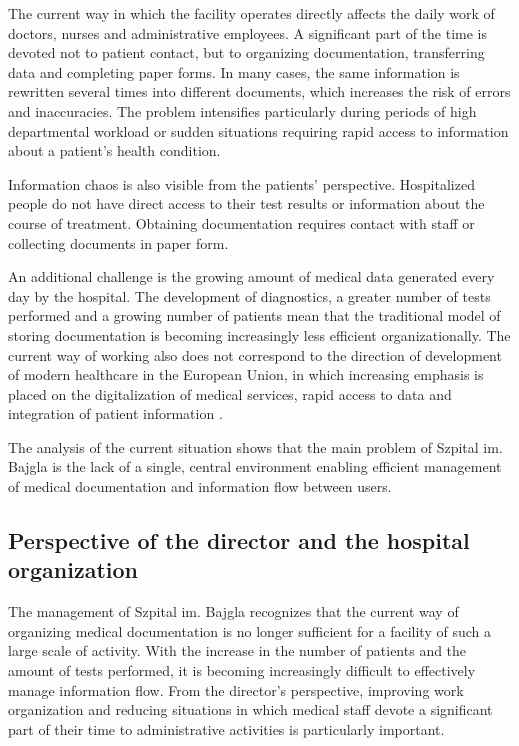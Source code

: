 The current way in which the facility operates directly affects the daily work of doctors, nurses and administrative employees. A significant part of the time is devoted not to patient contact, but to organizing documentation, transferring data and completing paper forms. In many cases, the same information is rewritten several times into different documents, which increases the risk of errors and inaccuracies. The problem intensifies particularly during periods of high departmental workload or sudden situations requiring rapid access to information about a patient's health condition.

Information chaos is also visible from the patients' perspective. Hospitalized people do not have direct access to their test results or information about the course of treatment. Obtaining documentation requires contact with staff or collecting documents in paper form.

An additional challenge is the growing amount of medical data generated every day by the hospital. The development of diagnostics, a greater number of tests performed and a growing number of patients mean that the traditional model of storing documentation is becoming increasingly less efficient organizationally. The current way of working also does not correspond to the direction of development of modern healthcare in the European Union, in which increasing emphasis is placed on the digitalization of medical services, rapid access to data and integration of patient information \cite{EU_eHealth_2024}.

The analysis of the current situation shows that the main problem of Szpital im. Bajgla is the lack of a single, central environment enabling efficient management of medical documentation and information flow between users.
\subsection{Perspective of the director and the hospital organization}

The management of Szpital im. Bajgla recognizes that the current way of organizing medical documentation is no longer sufficient for a facility of such a large scale of activity. With the increase in the number of patients and the amount of tests performed, it is becoming increasingly difficult to effectively manage information flow. From the director's perspective, improving work organization and reducing situations in which medical staff devote a significant part of their time to administrative activities is particularly important.

